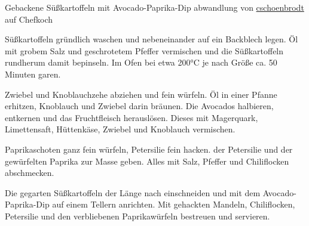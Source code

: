 \begin{recipe}[]{ Gebackene Süßkartoffeln mit Avocado-Paprika-Dip }{ abwandlung von \href{http://www.chefkoch.de/rezepte/2725361425059942/Gebackene-Suesskartoffeln-mit-Avocado-Paprika-Creme.html}{cschoenbrodt} auf Chefkoch }


  	
\step
Süßkartoffeln gründlich waschen und nebeneinander auf ein Backblech legen. 
Öl mit grobem Salz und geschrotetem Pfeffer vermischen und die Süßkartoffeln rundherum damit bepinseln. 
Im Ofen bei etwa 200°C je nach Größe ca. 50 Minuten garen.

\step
Zwiebel und Knoblauchzehe abziehen und fein würfeln. Öl in einer Pfanne erhitzen, Knoblauch und Zwiebel darin bräunen.
Die Avocados halbieren, entkernen und das Fruchtfleisch herauslösen. Dieses mit Magerquark, Limettensaft, 
Hüttenkäse, Zwiebel und Knoblauch vermischen.

\step
Paprikaschoten ganz fein würfeln, Petersilie fein hacken.  der Petersilie und der gewürfelten Paprika zur Masse geben. Alles mit Salz, Pfeffer und Chiliflocken abschmecken.

\step
Die gegarten Süßkartoffeln der Länge nach einschneiden und mit dem Avocado-Paprika-Dip auf einem Tellern anrichten. Mit gehackten Mandeln, Chiliflocken, Petersilie und den verbliebenen Paprikawürfeln bestreuen und servieren. 



\end{recipe}
